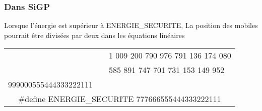 \subsubsection{Dans SiGP}
Lorsque l'énergie est supérieur à ENERGIE\_SECURITE, La position des mobiles pourrait être divisées par deux dans les équations linéaires


\begin{center}
	\begin{tabular}{rcl}
 &  &1 009 200 790 976 791 136 174 080\\
 &  &  585 891 747 701 731 153 149 952\\
      999000555444333222111\\
\multicolumn{3}{c}{\#define ENERGIE\_SECURITE 777666555444333222111}\\
	\end{tabular}
\end{center}
%
